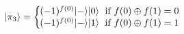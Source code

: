 \documentclass[preview]{standalone}
\begin{document}
\begin{align*}
|\pi_3\rangle = \left\{ \begin{array}{ll} \hspace{-2mm} (-1)^{f(0)} |-\rangle |0\rangle \; \text{ if } f(0) \oplus f(1) = 0 \\ \hspace{-2mm} (-1)^{f(0)} |-\rangle|1\rangle \; \text{ if } f(0) \oplus f(1) = 1 \end{array} \right.
\end{align*}
\end{document}
